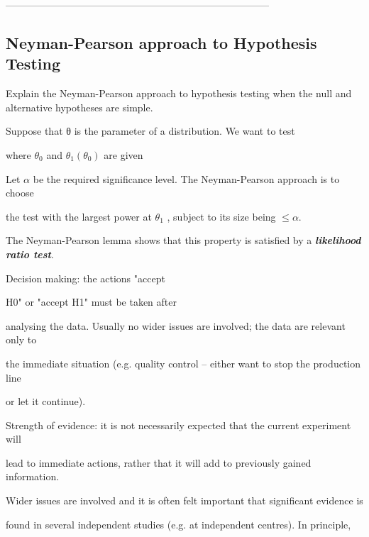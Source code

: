 --------------------------------------------------------------------------------

\subsection*{Neyman-Pearson approach to Hypothesis Testing}

Explain the Neyman-Pearson approach to hypothesis testing when the null and alternative hypotheses are simple.

 

Suppose that θ is the parameter of a distribution. We want to test

 


 

where $\theta_0$ and $\theta_1(\theta_0)$ are given

 

Let $\alpha$ be the required significance level. The Neyman-Pearson approach is to choose

the test with the largest power at $\theta_1$ , subject to its size being $ \leq \alpha$.

 

The Neyman-Pearson lemma shows that this property is satisfied by a \textbf{\textit{likelihood ratio test}}.





\newpage

Decision making: the actions "accept

H0" or "accept H1" must be taken after

analysing the data. Usually no wider issues are involved; the data are relevant only to

the immediate situation (e.g. quality control – either want to stop the production line

or let it continue).

 

Strength of evidence: it is not necessarily expected that the current experiment will

lead to immediate actions, rather that it will add to previously gained information.

Wider issues are involved and it is often felt important that significant evidence is

found in several independent studies (e.g. at independent centres). In principle,

